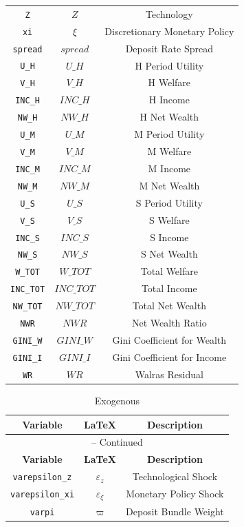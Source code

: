 \begin{center}
\begin{longtable}{ccc}
\texttt{Z} & $Z$ & Technology\\
\texttt{xi} & $\xi$ & Discretionary Monetary Policy\\
\texttt{spread} & $spread$ & Deposit Rate Spread\\
\texttt{U\_H} & $U\_H$ & H Period Utility\\
\texttt{V\_H} & $V\_H$ & H Welfare\\
\texttt{INC\_H} & $INC\_H$ & H Income\\
\texttt{NW\_H} & $NW\_H$ & H Net Wealth\\
\texttt{U\_M} & $U\_M$ & M Period Utility\\
\texttt{V\_M} & $V\_M$ & M Welfare\\
\texttt{INC\_M} & $INC\_M$ & M Income\\
\texttt{NW\_M} & $NW\_M$ & M Net Wealth\\
\texttt{U\_S} & $U\_S$ & S Period Utility\\
\texttt{V\_S} & $V\_S$ & S Welfare\\
\texttt{INC\_S} & $INC\_S$ & S Income\\
\texttt{NW\_S} & $NW\_S$ & S Net Wealth\\
\texttt{W\_TOT} & $W\_TOT$ & Total Welfare\\
\texttt{INC\_TOT} & $INC\_TOT$ & Total Income\\
\texttt{NW\_TOT} & $NW\_TOT$ & Total Net Wealth\\
\texttt{NWR} & $NWR$ & Net Wealth Ratio\\
\texttt{GINI\_W} & $GINI\_W$ & Gini Coefficient for Wealth\\
\texttt{GINI\_I} & $GINI\_I$ & Gini Coefficient for Income\\
\texttt{WR} & $WR$ & Walras Residual\\
\hline%
\end{longtable}
\end{center}
\begin{center}
\begin{longtable}{ccc}
\caption{Exogenous}\\%
\hline%
\multicolumn{1}{c}{\textbf{Variable}} &
\multicolumn{1}{c}{\textbf{\LaTeX}} &
\multicolumn{1}{c}{\textbf{Description}}\\%
\hline\hline%
\endfirsthead
\multicolumn{3}{c}{{\tablename} \thetable{} -- Continued}\\%
\hline%
\multicolumn{1}{c}{\textbf{Variable}} &
\multicolumn{1}{c}{\textbf{\LaTeX}} &
\multicolumn{1}{c}{\textbf{Description}}\\%
\hline\hline%
\endhead
\texttt{varepsilon\_z} & $\varepsilon_z$ & Technological Shock\\
\texttt{varepsilon\_xi} & $\varepsilon_\xi$ & Monetary Policy Shock\\
\texttt{varpi} & $\varpi$ & Deposit Bundle Weight\\
\hline%
\end{longtable}
\end{center}
